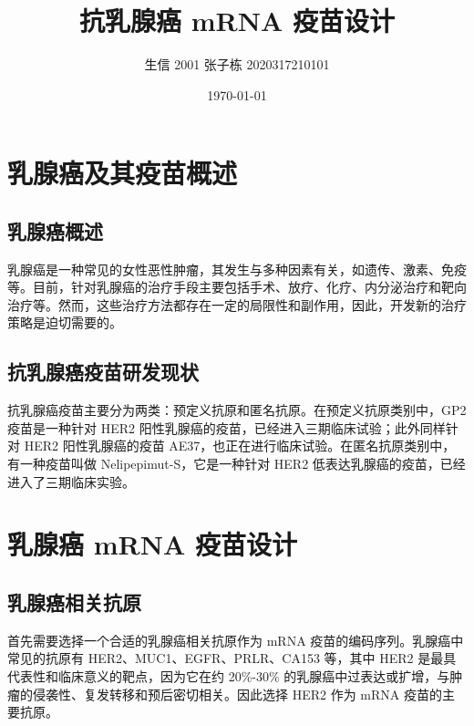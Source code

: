 \documentclass{ctexart}
\title{抗乳腺癌 mRNA 疫苗设计}
\author{生信 2001 张子栋 2020317210101}
\date{\today}
\begin{document}
    \maketitle
    \thispagestyle{empty}

    \newpage
    \tableofcontents
    \setcounter{page}{0}
    \thispagestyle{empty}

    \newpage


    \section{乳腺癌及其疫苗概述}

    \subsection{乳腺癌概述}

    乳腺癌是一种常见的女性恶性肿瘤\textsuperscript{\cite{ref1}}，其发生与多种因素有关，如遗传、激素、免疫等。目前，针对乳腺癌的治疗手段主要包括手术、放疗、化疗、内分泌治疗和靶向治疗等。然而，这些治疗方法都存在一定的局限性和副作用，因此，开发新的治疗策略是迫切需要的。
    
    \subsection{抗乳腺癌疫苗研发现状}
    抗乳腺癌疫苗主要分为两类：预定义抗原和匿名抗原\textsuperscript{\cite{ref2}}。在预定义抗原类别中，GP2 疫苗是一种针对 HER2 阳性乳腺癌的疫苗，已经进入三期临床试验；此外同样针对 HER2 阳性乳腺癌的疫苗 AE37，也正在进行临床试验。在匿名抗原类别中，有一种疫苗叫做 Nelipepimut-S，它是一种针对 HER2 低表达乳腺癌的疫苗，已经进入了三期临床实验。 



    \section{乳腺癌 mRNA 疫苗设计}
    \subsection{乳腺癌相关抗原}
    首先需要选择一个合适的乳腺癌相关抗原作为 mRNA 疫苗的编码序列\textsuperscript{\cite{ref3}}。乳腺癌中常见的抗原有 HER2、MUC1、EGFR、PRLR、CA153 等，其中 HER2 是最具代表性和临床意义的靶点，因为它在约 20\%-30\% 的乳腺癌中过表达或扩增，与肿瘤的侵袭性、复发转移和预后密切相关。因此选择 HER2 作为 mRNA 疫苗的主要抗原。
\end{document}
